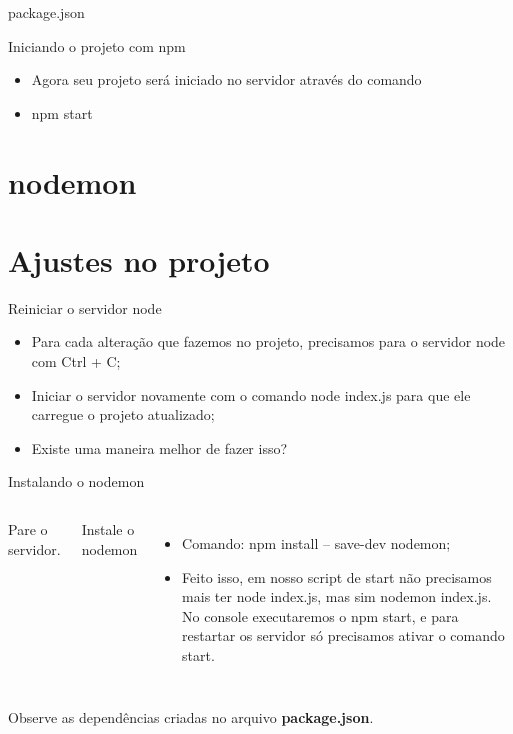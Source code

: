 \documentclass{beamer}
\begin{document}
    \begin{frame}[label=lists]{package.json}
		\begin{exampleblock}{Iniciando o projeto com npm}
	\begin{itemize}
	\item Agora seu projeto será iniciado no servidor através do comando
	\item \alert{npm start}
	\end{itemize}
	\end{exampleblock}
    \end{frame}
 \section{nodemon}
\section{Ajustes no projeto}
    \begin{frame}[label=proof]{Reiniciar o servidor node}
	\begin{itemize}
	\item Para cada alteração que fazemos no projeto, precisamos para o servidor node com \alert{Ctrl + C};
	\item Iniciar o servidor novamente com o comando \alert{node index.js} para que ele carregue o projeto atualizado;
	\item Existe uma maneira melhor de fazer isso?
	\end{itemize}
    \end{frame}
    \begin{frame}{Instalando o nodemon}
      \begin{columns}[onlytextwidth]
         Pare o servidor.
        
          \vspace{0.5cm}
	Instale o nodemon
            \pause
            \begin{itemize}
		\item Comando: \alert{npm install -- save-dev nodemon};
		\item Feito isso, em nosso script de start não precisamos mais ter node index.js, mas sim nodemon index.js. No console executaremos o npm start, e para restartar os servidor só precisamos ativar o comando start.
	\end{itemize}
      \end{columns}
      Observe as dependências criadas no arquivo \textbf{package.json}.
    \end{frame}
   
%
%
  
\end{document}
